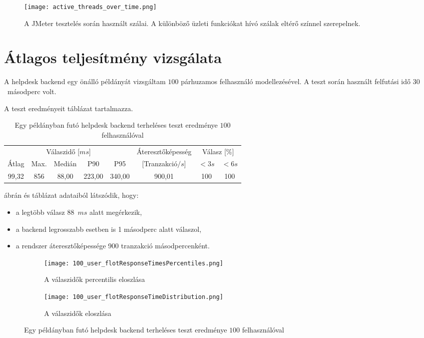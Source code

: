 \begin{figure}[hbt] 
	\centering
	\texttt{[image: active\_threads\_over\_time.png]}
	\caption[A JMeter tesztelés során használt szálai]{A JMeter tesztelés során használt szálai. A különböző üzleti funkciókat hívó szálak eltérő színnel szerepelnek.}
	\label{fig:active_threads_over_time}
\end{figure}



\section{Átlagos teljesítmény vizsgálata}
A helpdesk backend egy önálló példányát vizsgáltam $100$ párhuzamos felhasználó modellezésével. A teszt során használt felfutási idő $30$~másodperc volt.

A teszt eredményeit  táblázat tartalmazza.

\begin{table}[hbt]
	
	\begin{tabular}{ccccc|c|cc}
		\multicolumn{5}{c|}{Válaszidő [$ms$]}  & Áteresztőképesség & \multicolumn{2}{c}{Válasz [\%]}	\\
		Átlag & Max. & Medián & P90 & P95 &	[Tranzakció$/s$] & $<3s$& $<6s$ \\
		\hline 
		99,32 & 856 & 88,00 & 223,00 & 340,00 & 900,01 & 100 & 100 \\
	\end{tabular} 
	
	\caption{Egy példányban futó helpdesk backend terheléses teszt eredménye $100$ felhasználóval}
	\label{tabl:1_instance_100_user}
\end{table}

 ábrán és  táblázat adataiból látszódik, hogy:
\begin{itemize}
	\item a legtöbb válasz 88~$ms$ alatt megérkezik,
	\item a backend legrosszabb esetben is 1 másodperc alatt válaszol,
	\item a rendszer áteresztőképessége 900 tranzakció másodpercenként.
\end{itemize}


\begin{figure}[hbt]
	\begin{subfigure}{.9\textwidth}
		\centering
		\texttt{[image: 100\_user\_flotResponseTimesPercentiles.png]}  
		\caption{A válaszidők percentilis eloszlása}
	\end{subfigure}
	\begin{subfigure}{.9\textwidth}
		\centering
		\texttt{[image: 100\_user\_flotResponseTimeDistribution.png]}  
		\caption{A válaszidők eloszlása}
	\end{subfigure}
	
	\caption[Helpdesk backend terheléses teszt 100 felhasználóval]{Egy példányban futó helpdesk backend terheléses teszt eredménye $100$ felhasználóval}
	\label{fig:1_instance_100_user}
\end{figure}

